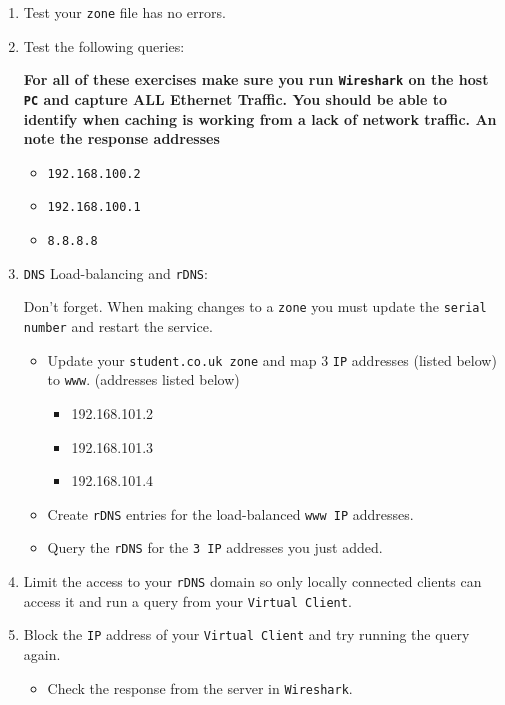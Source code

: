 \documentclass[11pt]{article}
\begin{document}
\begin{enumerate}
\begin{itemize}
        \end{itemize}
    \item Test your \texttt{zone} file has no errors.
    \item Test the following queries:
        \begin{tcolorbox}[colback=blue!20]
            \noindent\textbf{For all of these exercises make sure you run \texttt{Wireshark} on the host \texttt{PC} and capture ALL Ethernet Traffic. You should be able to identify when caching is working from a lack of network traffic. An note the response addresses}
        \end{tcolorbox}
        \begin{itemize}
            \item \texttt{192.168.100.2}
            \item \texttt{192.168.100.1}
            \item \texttt{8.8.8.8}
        \end{itemize}
    \item \texttt{DNS} Load-balancing and \texttt{rDNS}:
    \begin{tcolorbox}[title={\textbf{NOTE:}}]
        \noindent Don't forget. When making changes to a \texttt{zone} you must update the \texttt{serial number} and restart the service.
    \end{tcolorbox}
    \begin{itemize}
            \item Update your \texttt{student.co.uk zone} and map 3 \texttt{IP} addresses (listed below) to \texttt{www}. (addresses listed below)
                \begin{itemize}
                    \item 192.168.101.2
                    \item 192.168.101.3
                    \item 192.168.101.4
                \end{itemize}
            \item Create \texttt{rDNS} entries for the load-balanced \texttt{www IP} addresses.
            \item Query the \texttt{rDNS} for the \texttt{3 IP} addresses you just added.
        \end{itemize}
    \item Limit the access to your \texttt{rDNS} domain so only locally connected clients can access it and run a query from your \texttt{Virtual Client}. 
    \item Block the \texttt{IP} address of your \texttt{Virtual Client} and try running the query again.
        \begin{itemize}
            \item Check the response from the server in \texttt{Wireshark}.
        \end{itemize}
\end{enumerate}    
\end{document}
